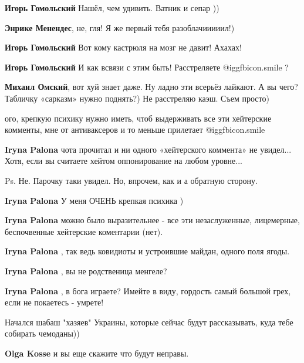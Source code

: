 \begin{itemize}
\begin{itemize} %
\textbf{Игорь Гомольский} Нашёл, чем удивить. Ватник и сепар ))

\textbf{Энрике Менендес}, не, гля! Я же первый тебя разоблачииииил!)

\textbf{Игорь Гомольский} Вот кому кастрюля на мозг не давит! Ахахах!

\textbf{Игорь Гомольский} И как всвязи с этим быть! Расстреляете  @igg{fbicon.smile} ?

\textbf{Михаил Омский}, вот хуй знает даже. Ну ладно эти всерьёз лайкают. А вы чего? Табличку «сарказм» нужно поднять?) Не расстреляю каэш. Съем просто)
\end{itemize} %


ого, крепкую психику нужно иметь, чтоб выдерживать все эти хейтерские комменты,
мне от антиваксеров и то меньше прилетает  @igg{fbicon.smile} 

\begin{itemize} %
\textbf{Iryna Palona} чота прочитал и ни одного «хейтерского коммента» не увидел... Хотя, если вы считаете хейтом оппонирование на любом уровне...

Ps. Не. Парочку таки увидел. Но, впрочем, как и а обратную сторону.


\textbf{Iryna Palona} У меня ОЧЕНЬ крепкая психика )

\textbf{Iryna Palona} можно было выразительнее - все эти незаслуженные, лицемерные, беспочвенные хейтерские коментарии (нет).

\textbf{Iryna Palona} , так ведь ковидиоты и устроившие майдан, одного поля ягоды.

\textbf{Iryna Palona} , вы не родственица менгеле?

\textbf{Iryna Palona} , в бога играете? Имейте в виду, гордость самый большой грех, если не покаетесь - умрете!
\end{itemize} %

Начался шабаш "хазяев" Украины, которые сейчас будут рассказывать, куда тебе собирать чемоданы))

\begin{itemize} %
\textbf{Olga Kosse} и вы еще скажите что будут неправы.


\end{itemize}
\end{itemize}
